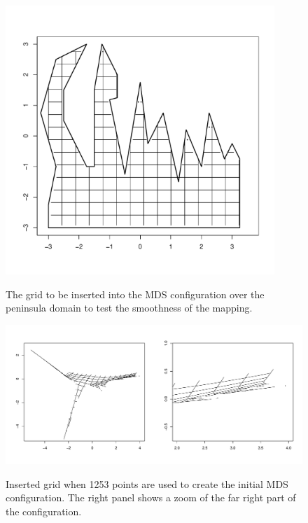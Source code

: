 \begin{figure}
\centering
\includegraphics[width=4in]{mds/figs/wt2-grid-orig.pdf} \\
\caption{The grid to be inserted into the MDS configuration over the peninsula domain to test the smoothness of the mapping.}
\label{wt2-grid-orig}
\end{figure}

\begin{figure}
\centering
\includegraphics[width=5in]{mds/figs/wt2-grid-full.pdf} \\
\caption{Inserted grid when 1253 points are used to create the initial MDS configuration. The right panel shows a zoom of the far right part of the configuration.}
\label{wt2-grid-full}
\end{figure}

